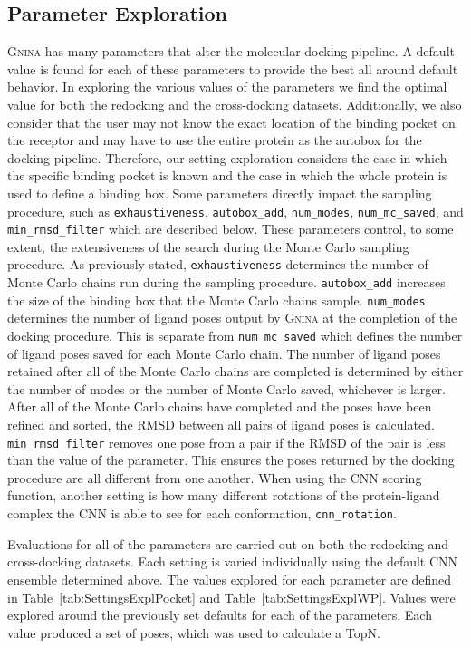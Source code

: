 \documentclass[linenumbers,doublespacing]{bmcart}
\begin{document}
\subsection{Parameter Exploration}
\textsc{Gnina} has many parameters that alter the molecular docking pipeline. A default value is found for each of these parameters to provide the best all around default behavior. In exploring the various values of the parameters we find the optimal value for both the redocking and the cross-docking datasets. Additionally, we also consider that the user may not know the exact location of the binding pocket on the receptor and may have to use the entire protein as the autobox for the docking pipeline. Therefore, our setting exploration considers the case in which the specific binding pocket is known and the case in which the whole protein is used to define a binding box. Some parameters directly impact the sampling procedure, such as \texttt{exhaustiveness}, \texttt{autobox\_add}, \texttt{num\_modes}, \texttt{num\_mc\_saved}, and \texttt{min\_rmsd\_filter} which are described below. These parameters control, to some extent, the extensiveness of the search during the Monte Carlo sampling procedure. As previously stated, \texttt{exhaustiveness} determines the number of Monte Carlo chains run during the sampling procedure. \texttt{autobox\_add} increases the size of the binding box that the Monte Carlo chains sample. \texttt{num\_modes} determines the number of ligand poses output by \textsc{Gnina} at the completion of the docking procedure. This is separate from \texttt{num\_mc\_saved} which defines the number of ligand poses saved for each Monte Carlo chain. The number of ligand poses retained after all of the Monte Carlo chains are completed is determined by either the number of modes or the number of Monte Carlo saved, whichever is larger. After all of the Monte Carlo chains have completed and the poses have been refined and sorted, the RMSD between all pairs of ligand poses is calculated. \texttt{min\_rmsd\_filter} removes one pose from a pair if the RMSD of the pair is less than the value of the parameter. This ensures the poses returned by the docking procedure are all different from one another. When using the CNN scoring function, another setting is how many different rotations of the protein-ligand complex the CNN is able to see for each conformation, \texttt{cnn\_rotation}.

Evaluations for all of the parameters are carried out on both the redocking and cross-docking datasets. Each setting is varied individually using the default CNN ensemble determined above. The values explored for each parameter are defined in Table~\ref{tab:SettingsExplPocket} and Table~\ref{tab:SettingsExplWP}. Values were explored around the previously set defaults for each of the parameters. Each value produced a set of poses, which was used to calculate a TopN.
\end{document}
